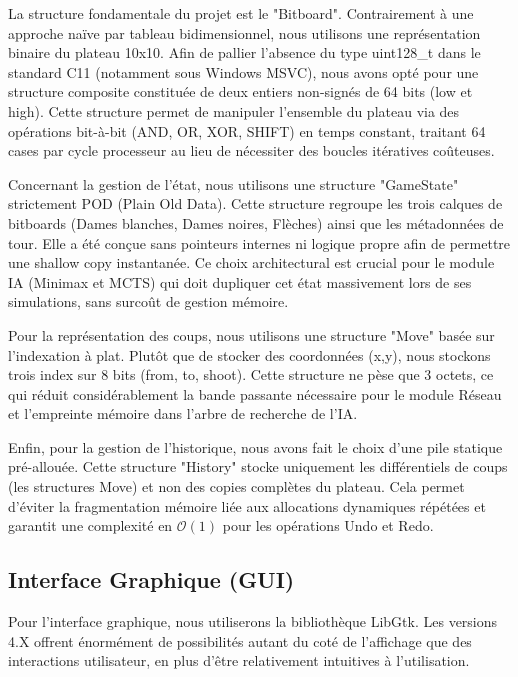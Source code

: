 \documentclass[12pt,a4paper,titlepage,oneside]{article}
\begin{document}
    La structure fondamentale du projet est le "Bitboard". Contrairement à une approche naïve par tableau bidimensionnel, nous utilisons une représentation binaire du plateau 10x10. Afin de pallier l'absence du type uint128\_t dans le standard C11 (notamment sous Windows MSVC), nous avons opté pour une structure composite constituée de deux entiers non-signés de 64 bits (low et high). Cette structure permet de manipuler l'ensemble du plateau via des opérations bit-à-bit (AND, OR, XOR, SHIFT) en temps constant, traitant 64 cases par cycle processeur au lieu de nécessiter des boucles itératives coûteuses. \newline

    Concernant la gestion de l'état, nous utilisons une structure "GameState" strictement POD (Plain Old Data). Cette structure regroupe les trois calques de bitboards (Dames blanches, Dames noires, Flèches) ainsi que les métadonnées de tour. Elle a été conçue sans pointeurs internes ni logique propre afin de permettre une shallow copy instantanée. Ce choix architectural est crucial pour le module IA (Minimax et MCTS) qui doit dupliquer cet état massivement lors de ses simulations, sans surcoût de gestion mémoire. \newline

    Pour la représentation des coups, nous utilisons une structure "Move" basée sur l'indexation à plat. Plutôt que de stocker des coordonnées (x,y), nous stockons trois index sur 8 bits (from, to, shoot). Cette structure ne pèse que 3 octets, ce qui réduit considérablement la bande passante nécessaire pour le module Réseau et l'empreinte mémoire dans l'arbre de recherche de l'IA. \newline

    Enfin, pour la gestion de l'historique, nous avons fait le choix d'une pile statique pré-allouée. Cette structure "History" stocke uniquement les différentiels de coups (les structures Move) et non des copies complètes du plateau. Cela permet d'éviter la fragmentation mémoire liée aux allocations dynamiques répétées et garantit une complexité en $\mathcal{O}(1)$ pour les opérations Undo et Redo.

    \subsection{Interface Graphique (GUI)}
    Pour l'interface graphique, nous utiliserons la bibliothèque LibGtk. Les versions 4.X offrent énormément de possibilités autant du coté de l'affichage que des interactions utilisateur, en plus d'être relativement intuitives à l'utilisation. \newline
\end{document}
